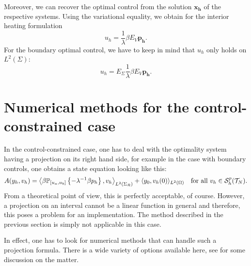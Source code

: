 \documentclass[../thesis.tex]{subfiles}
\begin{document}
Moreover, we can recover the optimal control from the solution $\boldsymbol{x_h}$ of the respective systems.
Using the variational equality, we obtain for the interior heating formulation
\[
	u_h = \frac{1}{\lambda} \beta E_V \boldsymbol{p_h}.
\]
For the boundary optimal control, we have to keep in mind that $u_h$ only holds on $L^2(\Sigma)$:
\[
	u_h = E_\Sigma \frac{1}{\lambda} \beta E_V \boldsymbol{p_h}.
\]
\section{Numerical methods for the control-constrained case}
In the control-constrained case, one has to deal with the optimality system having a projection on its right hand side, for example in the case with boundary controls, one obtains a state equation looking like this:
\[
A(y_h, v_h) = \left\langle \beta \mathbb{P}_{[u_a, u_b]} \left\{ - \lambda^{-1} \beta p_h \right\}, v_h \right\rangle_{L^2(\Sigma_R)} + \langle y_0, v_h(0) \rangle_{L^2(\Omega)} \quad \text{for all $v_h \in \mathcal{S}_h^p(\mathcal{T}_N)$}.
\]
From a theoretical point of view, this is perfectly acceptable, of course.
However, a projection on an interval cannot be a linear function in general and therefore, this poses a problem for an implementation.
The method described in the previous section is simply not applicable in this case.

In effect, one has to look for numerical methods that can handle such a projection formula.
There is a wide variety of options available here, see \cite[p.\ 134ff.]{Troeltzsch} for some discussion on the matter.
\end{document}
